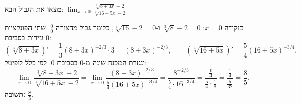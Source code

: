 
\begin{question}
מצאו את הגבול הבא:
$\displaystyle \lim_{x\to 0}\frac{\sqrt[3]{8+3x}-2}{\sqrt[4]{16+5x}-2}$
\end{question}

\begin{solution}
בנקודה $x=0$: $\sqrt[3]{8}-2=0$ ו-$\sqrt[4]{16}-2=0$, כלומר גבול מהצורה $\frac00$. שתי הפונקציות גזירות בסביבת $0$:
\[
\left(\sqrt[3]{8+3x}\right)'=\frac13(8+3x)^{-2/3}\cdot3=(8+3x)^{-2/3},\qquad
\left(\sqrt[4]{16+5x}\right)'=\frac54(16+5x)^{-3/4},
\]
ונגזרת המכנה שונה מ-$0$ בסביבת $0$. לפי כלל לופיטל:
\[
\lim_{x\to0}\frac{\sqrt[3]{8+3x}-2}{\sqrt[4]{16+5x}-2}
=\lim_{x\to0}\frac{(8+3x)^{-2/3}}{\frac54(16+5x)^{-3/4}}
=\frac{8^{-2/3}}{\frac54\cdot16^{-3/4}}=\frac{\frac14}{\frac54\cdot\frac18}=\frac{\frac14}{\frac{5}{32}}=\frac85.
\]
\textbf{תשובה:} $\frac85$.
\end{solution}
